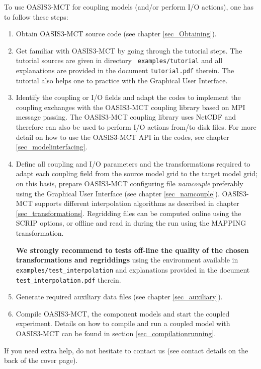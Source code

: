 To use OASIS3-MCT for coupling models (and/or perform I/O
actions), one has to follow these steps:
\begin{enumerate}
\item Obtain OASIS3-MCT source code (see chapter \ref{sec_Obtaining}).
\item Get familiar with OASIS3-MCT by going through the tutorial steps. The tutorial sources are given in directory {\tt
  examples/tutorial} and all explanations are provided in the document
{\tt tutorial.pdf} therein. The tutorial also helps one to
practice with the Graphical User Interface.

\item Identify the coupling or I/O fields and adapt the codes to
  implement the coupling exchanges with the OASIS3-MCT coupling library based on MPI message passing.
  The OASIS3-MCT coupling library uses NetCDF and therefore can also be used to perform I/O actions
  from/to disk files.  For more detail on how to use the 
  OASIS3-MCT API in the codes, see chapter \ref{sec_modelinterfacing}.

\item Define all coupling and I/O parameters and the transformations
  required to adapt each coupling field from the source model grid to
  the target model grid; on this basis, prepare OASIS3-MCT configuring file 
  {\it namcouple} preferably using the
  Graphical User Interface  (see chapter \ref{sec_namcouple}). 
  OASIS3-MCT supports different interpolation algorithms as described in
  chapter \ref{sec_transformations}.  Regridding files can be computed
  online using the SCRIP options, or offline and read in during the run using the MAPPING
  transformation.

{\bf We strongly recommend to tests off-line the quality of the chosen transformations and regriddings} using the environment available in {\tt
  examples/test\_interpolation} and explanations provided in the document {\tt test\_interpolation.pdf} therein. 

\item Generate required auxiliary data files (see chapter
  \ref{sec_auxiliary}).
\item Compile OASIS3-MCT, the component models and start the coupled
  experiment. Details on how to compile and run a coupled model with OASIS3-MCT can be found in section \ref{sec_compilationrunning}. 

\end{enumerate}

If you need extra help, do not hesitate to contact us (see contact
details on the back of the cover page).


